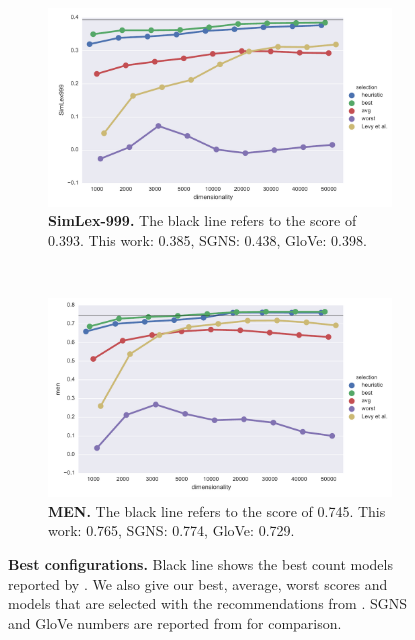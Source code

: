 \begin{figure}
  \centering
  \begin{subfigure}[b]{0.49\textwidth}
    \centerline{\includegraphics[width=\textwidth]{supplement/figures/SimLex999-global-best}}
    \caption{\textbf{SimLex-999.} The black line refers to the score of 0.393.
      This work: 0.385,
      SGNS: 0.438,
      GloVe: 0.398.
    }
    \label{fig:global-best-simlex}
  \end{subfigure}
~
  \begin{subfigure}[b]{0.49\textwidth}
    \centerline{\includegraphics[width=\textwidth]{supplement/figures/men-global-best}}
    \caption{\textbf{MEN.} The black line refers to the score of 0.745.
      This work: 0.765,
      SGNS: 0.774,
      GloVe: 0.729.
    }
    \label{fig:global-best-men}
  \end{subfigure}

  \caption{\textbf{Best configurations.} Black line shows the best count models reported by \protect{}. We also give our best, average, worst scores and models that are selected with the recommendations from \protect{}.
SGNS and GloVe numbers are reported from \protect{} for comparison.}
  \label{fig:global-best}
\end{figure}

